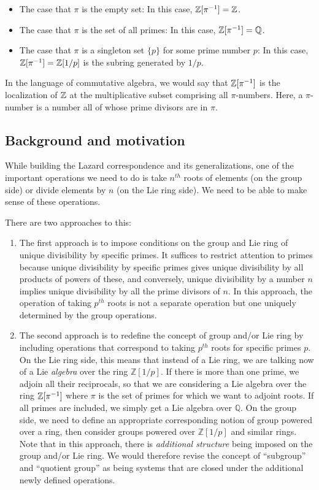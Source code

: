 \begin{itemize}
\item The case that $\pi$ is the empty set: In this case,
  $\mathbb{Z}[\pi^{-1}] = \mathbb{Z}$.
\item The case that $\pi$ is the set of all primes: In this case,
  $\mathbb{Z}[\pi^{-1}] = \mathbb{Q}$.
\item The case that $\pi$ is a singleton set $\{ p \}$ for some prime
  number $p$: In this case, $\mathbb{Z}[\pi^{-1}] = \mathbb{Z}[1/p]$ is the subring
  generated by $1/p$.
\end{itemize}

In the language of commutative algebra, we would say that
$\mathbb{Z}[\pi^{-1}]$ is the localization of $\mathbb{Z}$ at the multiplicative
subset comprising all $\pi$-numbers. Here, a $\pi$-number is a number
all of whose prime divisors are in $\pi$.

\subsection{Background and motivation}

While building the Lazard correspondence and its generalizations, one
of the important operations we need to do is take $n^{th}$ roots of
elements (on the group side) or divide elements by $n$ (on the Lie
ring side). We need to be able to make sense of these operations.

There are two approaches to this:

\begin{enumerate}
\item The first approach is to impose conditions on the group and Lie
  ring of unique divisibility by specific primes. It suffices to
  restrict attention to primes because unique divisibility by specific
  primes gives unique divisibility by all products of powers of these,
  and conversely, unique divisibility by a number $n$ implies unique
  divisibility by all the prime divisors of $n$. In this approach, the
  operation of taking $p^{th}$ roots is not a separate operation but
  one uniquely determined by the group operations.

\item The second approach is to redefine the concept of group and/or
  Lie ring by including operations that correspond to taking $p^{th}$
  roots for specific primes $p$. On the Lie ring side, this means that
  instead of a Lie ring, we are talking now of a Lie {\em algebra}
  over the ring $\mathbb{Z}[1/p]$. If there is more than one prime, we
  adjoin all their reciprocals, so that we are considering a Lie
  algebra over the ring $\mathbb{Z}[\pi^{-1}]$ where $\pi$ is the set of
  primes for which we want to adjoint roots. If all primes are
  included, we simply get a Lie algebra over $\mathbb{Q}$. On the
  group side, we need to define an appropriate corresponding notion of
  group powered over a ring, then consider groups powered over
  $\mathbb{Z}[1/p]$ and similar rings. Note that in this approach,
  there is {\em additional structure} being imposed on the group
  and/or Lie ring. We would therefore revise the concept of
  ``subgroup'' and ``quotient group'' as being systems that are closed
  under the additional newly defined operations.
\end{enumerate}

